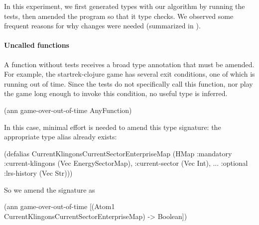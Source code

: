 \label{infer:sec:experiment2}

In this experiment, we first generated types with our algorithm
by running the tests, then amended the program so that it
type checks.
We observed some frequent reasons for why changes were needed
(summarized in ).

\paragraph{Uncalled functions}
A function without tests receives a broad type annotation that
must be amended.
%
For example, the startrek-clojure game has several exit
conditions, one of which is running out of time.
Since the tests do not specifically call this function,
nor play the game long enough to invoke this condition,
no useful type is inferred.

\begin{cljlisting}
(ann game-over-out-of-time AnyFunction)
\end{cljlisting}

In this case, minimal effort is needed to amend this
type signature: the appropriate type alias
already exists:

\begin{cljlisting}
(defalias CurrentKlingonsCurrentSectorEnterpriseMap
  (HMap :mandatory
    {:current-klingons (Vec EnergySectorMap),
     :current-sector (Vec Int), ...}
    :optional {:lrs-history (Vec Str)}))
\end{cljlisting}

So we amend the signature as

\begin{cljlisting}
(ann game-over-out-of-time
  [(Atom1 CurrentKlingonsCurrentSectorEnterpriseMap) 
   -> Boolean])
\end{cljlisting}


